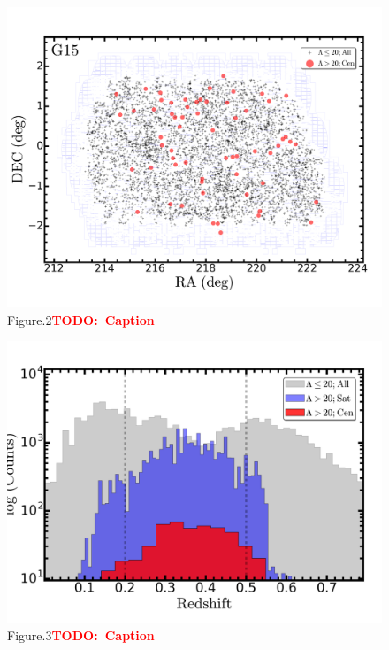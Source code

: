 \documentclass[preprint]{aastex}
\newcommand{\todo}[1]{\textcolor{red}{\textbf{TODO:~#1}}}
\begin{document}
\begin{CJK*}{UTF8}{gbsn}
\clearpage
{}
\begin{figure}
    \centering 
    \includegraphics[width=13.5cm]{fig/massive_s15b_g15_sample.png}
    \caption{Figure.2\todo{Caption}}
    \label{figure:2}
\end{figure}

\clearpage
{}
\begin{figure}
    \centering 
    \includegraphics[width=13.5cm]{fig/massive_s15b_zuse_hist1.png}
    \caption{Figure.3\todo{Caption}}
    \label{figure:3}
\end{figure}


\end{CJK*}
\end{document}
